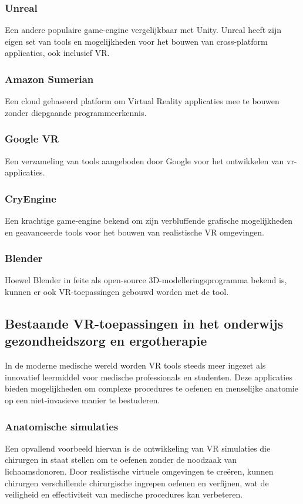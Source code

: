 \subsubsection{Unreal}
Een andere populaire game-engine vergelijkbaar met Unity. Unreal heeft zijn eigen set van tools en mogelijkheden voor het bouwen van cross-platform applicaties, ook inclusief VR.

\subsubsection{Amazon Sumerian}
Een cloud gebaseerd platform om Virtual Reality applicaties mee te bouwen zonder diepgaande programmeerkennis.

\subsubsection{Google VR}
Een verzameling van tools aangeboden door Google voor het ontwikkelen van vr-applicaties.

\subsubsection{CryEngine}
Een krachtige game-engine bekend om zijn verbluffende grafische mogelijkheden en geavanceerde tools voor het bouwen van realistische VR omgevingen.

\subsubsection{Blender}
Hoewel Blender in feite als open-source 3D-modelleringsprogramma bekend is, kunnen er ook VR-toepassingen gebouwd worden met de tool.





\subsection{Bestaande VR-toepassingen in het onderwijs gezondheidszorg en ergotherapie}

In de moderne medische wereld worden VR tools steeds meer ingezet als innovatief leermiddel voor medische professionals en studenten. Deze applicaties bieden mogelijkheden om complexe procedures te oefenen en menselijke anatomie op een niet-invasieve manier te bestuderen.
\subsubsection{Anatomische simulaties}
Een opvallend voorbeeld hiervan is de ontwikkeling van VR simulaties die chirurgen in staat stellen om te oefenen zonder de noodzaak van lichaamsdonoren. Door realistische virtuele omgevingen te creëren, kunnen chirurgen verschillende chirurgische ingrepen oefenen en verfijnen, wat de veiligheid en effectiviteit van medische procedures kan verbeteren.

